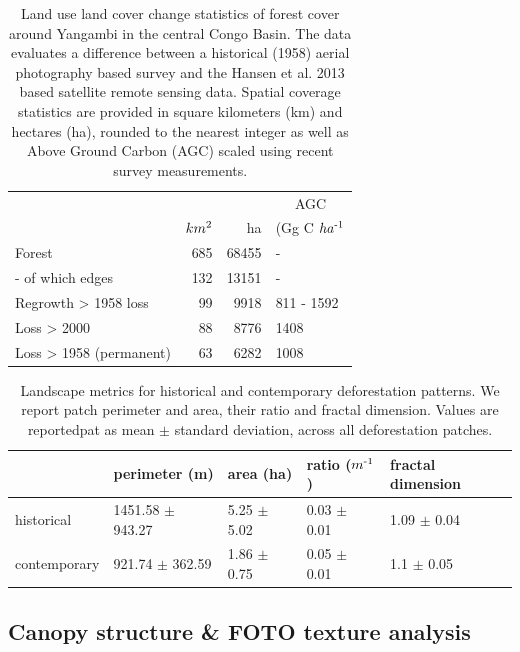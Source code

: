 \documentclass[remote sensing,article,submit,moreauthors,pdftex,10pt,a4paper]{mdpi}
\begin{document}
\begin{table}[!h]

\caption{\label{tab:unnamed-chunk-6}Land use land cover change statistics of forest cover around Yangambi in the central Congo Basin. The data evaluates a difference between a historical (1958) aerial photography based survey and the Hansen et al. 2013 based satellite remote sensing data. Spatial coverage statistics are provided in square kilometers (km) and hectares (ha), rounded to the nearest integer as well as Above Ground Carbon (AGC) scaled using recent survey measurements.}
\centering
\begin{tabular}[t]{lrrl}
\toprule
\multicolumn{3}{c}{ } & \multicolumn{1}{c}{AGC} \\
\cmidrule(l{3pt}r{3pt}){4-4}
  & $km\textsuperscript{2}$ & ha & (Gg C $ha\textsuperscript{-1}$\\
\midrule
Forest & 685 & 68455 & -\\
-  of which edges & 132 & 13151 & -\\
Regrowth > 1958 loss & 99 & 9918 & 811 - 1592\\
Loss > 2000 & 88 & 8776 & 1408\\
Loss > 1958 (permanent) & 63 & 6282 & 1008\\
\bottomrule
\end{tabular}
\end{table}

\begin{table}[!h]

\caption{\label{tab:unnamed-chunk-7}Landscape metrics for historical and contemporary deforestation patterns. We report patch perimeter and area, their ratio and fractal dimension. Values are reportedpat as mean $\pm$ standard deviation, across all deforestation patches.}
\centering
\begin{tabular}[t]{lllll}
\toprule
  & perimeter (m) & area (ha) & ratio ($m\textsuperscript{-1}$) & fractal dimension\\
\midrule
historical & 1451.58 $\pm$ 943.27 & 5.25 $\pm$ 5.02 & 0.03 $\pm$ 0.01 & 1.09 $\pm$ 0.04\\
contemporary & 921.74 $\pm$ 362.59 & 1.86 $\pm$ 0.75 & 0.05 $\pm$ 0.01 & 1.1 $\pm$ 0.05\\
\bottomrule
\end{tabular}
\end{table}

\hypertarget{canopy-structure-foto-texture-analysis-1}{%
\subsection{Canopy structure \& FOTO texture
analysis}\label{canopy-structure-foto-texture-analysis-1}}
\end{document}
